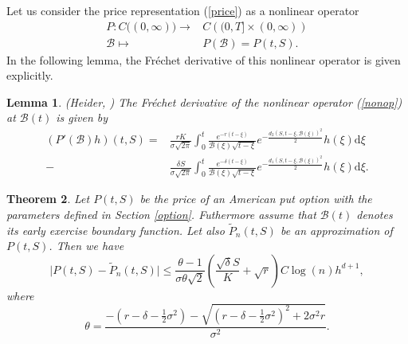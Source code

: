 \documentclass[fleqn,final,3p,11pt]{elsarticle}
\newtheorem{theorem}{Theorem}[section]
\newtheorem{lemma}[theorem]{Lemma}
\theoremstyle{definition}
\theoremstyle{remark}
\numberwithin{equation}{section}
\begin{document}
Let us consider the price representation (\ref{price}) as a nonlinear operator
 \begin{equation}\label{nonop}
 \begin{split}
 P :  C\big(  (0, \infty) \big)  \rightarrow & C \left((0, T]\times (0, \infty)\right) \\
 \mathcal{B}\mapsto & P(\mathcal{B}) =  P(t,S).
 \end{split}
 \end{equation}
In the following lemma,  the Fr\'{e}chet derivative of this nonlinear operator is given explicitly.
  \begin{lemma} (Heider, \cite{heider2007condition})
 The Fr\'{e}chet derivative of the nonlinear operator (\ref{nonop}) at $\mathcal{B}(t)$ is given by
  \begin{equation}
  \begin{split}
  (P'(\mathcal{B})h) (t,S) =&  \frac{rK}{\sigma \sqrt{2\pi}}\int_{0}^{t} \frac{e^{-r (t-\xi)}}{\mathcal{B}(\xi) \sqrt{t-\xi}} e^{- \frac{d_{2}(S, t-\xi, \mathcal{B}(\xi))^{2}}{2}} h(\xi) \mathrm{d}\xi \\
  - & \frac{\delta S}{\sigma \sqrt{2\pi}}\int_{0}^{t} \frac{e^{-\delta (t-\xi)}}{\mathcal{B}(\xi) \sqrt{t-\xi}} e^{- \frac{d_{1}(S, t-\xi, \mathcal{B}(\xi))^{2}}{2}} h(\xi) \mathrm{d}\xi.
  \end{split}
  \end{equation}
 \end{lemma}
 \begin{theorem}\label{errores}
Let $P(t, S)$ be the price of an American put option with the parameters defined in Section \ref{option}. Futhermore assume that $\mathcal{B}(t)$ denotes its early exercise boundary function. Let also $\tilde{P}_{n}(t, S)$ be an approximation of $P(t, S)$.
 Then we have
 \[\vert P(t, S) - \tilde{P}_{n}(t, S) \vert \leq \frac{\theta -1}{\sigma \theta \sqrt{2}} \left( \frac{\sqrt{\delta}S}{K} + \sqrt{r}\right)
C\log(n)h^{d+1},  \]
 where
 \[ \theta = \frac{- (r-\delta- \frac{1}{2}\sigma^{2}) - \sqrt{(r-\delta- \frac{1}{2}\sigma^{2})^{2} + 2 \sigma^{2}r}}{ \sigma^{2}}. \]
 \end{theorem}
\end{document}
